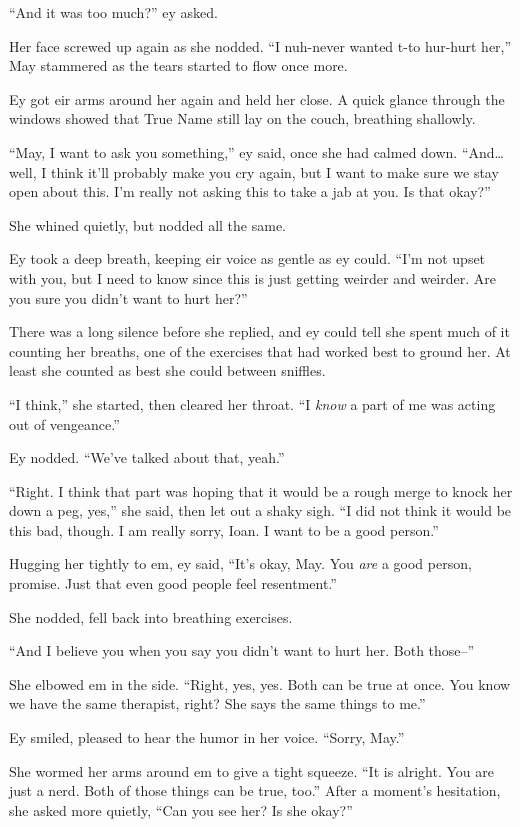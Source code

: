 ``And it was too much?'' ey asked.

Her face screwed up again as she nodded. ``I nuh-never wanted t-to hur-hurt her,'' May stammered as the tears started to flow once more.

Ey got eir arms around her again and held her close. A quick glance through the windows showed that True Name still lay on the couch, breathing shallowly.

``May, I want to ask you something,'' ey said, once she had calmed down. ``And\ldots well, I think it'll probably make you cry again, but I want to make sure we stay open about this. I'm really not asking this to take a jab at you. Is that okay?''

She whined quietly, but nodded all the same.

Ey took a deep breath, keeping eir voice as gentle as ey could. ``I'm not upset with you, but I need to know since this is just getting weirder and weirder. Are you sure you didn't want to hurt her?''

There was a long silence before she replied, and ey could tell she spent much of it counting her breaths, one of the exercises that had worked best to ground her. At least she counted as best she could between sniffles.

``I think,'' she started, then cleared her throat. ``I \emph{know} a part of me was acting out of vengeance.''

Ey nodded. ``We've talked about that, yeah.''

``Right. I think that part was hoping that it would be a rough merge to knock her down a peg, yes,'' she said, then let out a shaky sigh. ``I did not think it would be this bad, though. I am really sorry, Ioan. I want to be a good person.''

Hugging her tightly to em, ey said, ``It's okay, May. You \emph{are} a good person, promise. Just that even good people feel resentment.''

She nodded, fell back into breathing exercises.

``And I believe you when you say you didn't want to hurt her. Both those--''

She elbowed em in the side. ``Right, yes, yes. Both can be true at once. You know we have the same therapist, right? She says the same things to me.''

Ey smiled, pleased to hear the humor in her voice. ``Sorry, May.''

She wormed her arms around em to give a tight squeeze. ``It is alright. You are just a nerd. Both of those things can be true, too.'' After a moment's hesitation, she asked more quietly, ``Can you see her? Is she okay?''

